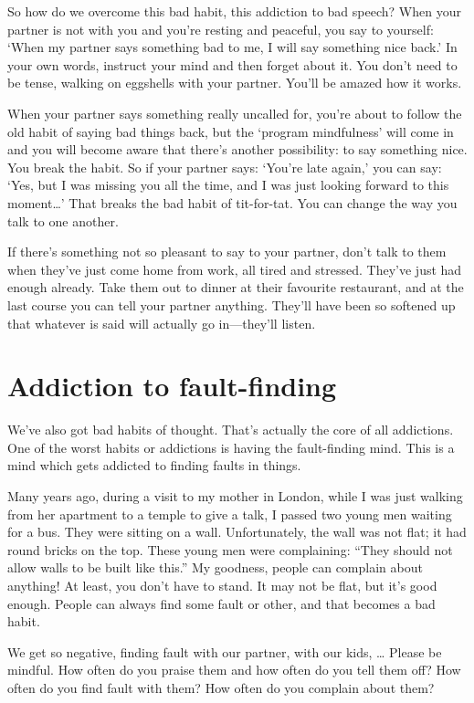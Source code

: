 \documentclass[12pt, openany]{book}
\begin{document}
So how do we overcome this bad habit, this addiction to bad speech? When your partner is not with you and you’re resting and peaceful, you say to yourself: ‘When my partner says something bad to me, I will say something nice back.’ In your own words, instruct your mind and then forget about it. You don’t need to be tense, walking on eggshells with your partner. You’ll be amazed how it works. 

When your partner says something really uncalled for, you’re about to follow the old habit of saying bad things back, but the ‘program mindfulness’ will come in and you will become aware that there’s another possibility: to say something nice. You break the habit. So if your partner says: ‘You’re late again,’ you can say: ‘Yes, but I was missing you all the time, and I was just looking forward to this moment…’ That breaks the bad habit of tit-for-tat. You can change the way you talk to one another. 

If there’s something not so pleasant to say to your partner, don’t talk to them when they’ve just come home from work, all tired and stressed. They’ve just had enough already. Take them out to dinner at their favourite restaurant, and at the last course you can tell your partner anything. They’ll have been so softened up that whatever is said will actually go in—they’ll listen. 

\section*{Addiction to fault-finding}

We’ve also got bad habits of thought. That’s actually the core of all addictions. One of the worst habits or addictions is having the fault-finding mind. This is a mind which gets addicted to finding faults in things. 

Many years ago, during a visit to my mother in London, while I was just walking from her apartment to a temple to give a talk, I passed two young men waiting for a bus. They were sitting on a wall. Unfortunately, the wall was not flat; it had round bricks on the top. These young men were complaining: “They should not allow walls to be built like this.” My goodness, people can complain about anything! At least, you don’t have to stand. It may not be flat, but it’s good enough. People can always find some fault or other, and that becomes a bad habit. 

We get so negative, finding fault with our partner, with our kids, … Please be mindful. How often do you praise them and how often do you tell them off? How often do you find fault with them? How often do you complain about them? 
\end{document}
